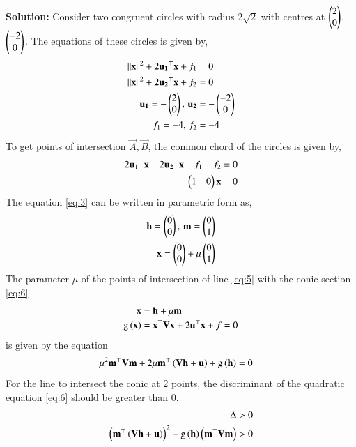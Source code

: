 \documentclass[journal,12pt,twocolumn]{IEEEtran}
\begin{document}
\begin{enumerate}
\textbf{Solution:}
Consider two congruent circles with radius $2\sqrt{2}$ with centres at $\begin{pmatrix}2\\0\end{pmatrix}$, $\begin{pmatrix}-2\\0\end{pmatrix}$. The equations of these circles is given by,
\begin{align}
\left\lVert\mathbf{x}\right\rVert^2 + 2\mathbf{u_1}^\top\mathbf{x} + f_1 &= 0 
\label{eq:1}\\
\left\lVert\mathbf{x}\right\rVert^2 + 2\mathbf{u_2}^\top\mathbf{x} + f_2 &= 0 
\label{eq:2}\\
\mathbf{u_1} = -\begin{pmatrix}2\\0\end{pmatrix}, \, \mathbf{u_2} &= -\begin{pmatrix}-2\\0\end{pmatrix}\\
f_1 = -4, \, f_2 &= -4
\end{align}
To get points of intersection $\vec{A}, \vec{B}$, the common chord of the circles is given by,
\begin{align}
2\mathbf{u_1}^\top\mathbf{x}-2\mathbf{u_2}^\top\mathbf{x}+f_1 - f_2 &= 0\\
\begin{pmatrix}1&0\end{pmatrix}\mathbf{x} &= 0
\label{eq:3}
\end{align}
The equation \eqref{eq:3} can be written in parametric form as,
\begin{align}
\mathbf{h} = \begin{pmatrix}0\\0\end{pmatrix}, \, \mathbf{m} = \begin{pmatrix}0\\1\end{pmatrix}\\
\mathbf{x} = \begin{pmatrix}0\\0\end{pmatrix} + \mu \begin{pmatrix}0\\1\end{pmatrix}
\label{eq:4}
\end{align} 
The parameter $\mu$ of the points of intersection of line \eqref{eq:5} with the conic section \eqref{eq:6}
\begin{align}
\mathbf{x} &= \mathbf{h} + \mu \mathbf{m}
\label{eq:5}\\
\text{g}\left(\mathbf{x}\right) &= \mathbf{x}^{\top}\mathbf{V}\mathbf{x}+2\mathbf{u}^{\top}\mathbf{x}+f=0
\label{eq:6}
\end{align}
is given by the equation 
\begin{align}
\mu^2\mathbf{m}^{\top}\mathbf{V}\mathbf{m} + 2 \mu\mathbf{m}^{\top}\left(\mathbf{V}\mathbf{h}+\mathbf{u}\right) + \text{g}\left(\mathbf{h}\right) &=0
\label{eq:7}
\end{align}
For the line to intersect the conic at 2 points, the discriminant of the quadratic equation \eqref{eq:6} should be greater than 0.
\begin{align}
\Delta &> 0\\
{\brak{\vec{m}^{\top}\brak{\vec{V}\vec{h}+\vec{u}}}}^2-\text{g}\brak{\vec{h}}\brak{\vec{m}^{\top}\vec{V}\vec{m}} &> 0

\end{align}
\end{enumerate}
\end{document}
